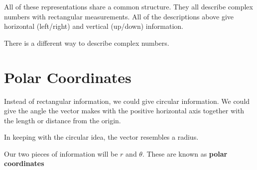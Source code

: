 \documentclass{ximera}
\begin{document}
\begin{image}
\end{image}






All of these representations share a common structure.  They all describe complex numbers with rectangular measurements.  All of the descriptions above give horizontal (left/right) and vertical (up/down) information.


There is a different way to describe complex numbers.



















\section{Polar Coordinates}

Instead of rectangular information, we could give circular information.  We could give the angle the vector makes with the positive horizontal axis together with the length or distance from the origin. 

In keeping with the circular idea, the vector resembles a radius.  

Our two pieces of information will be $r$ and $\theta$. These are known as \textbf{polar coordinates}
\end{document}
